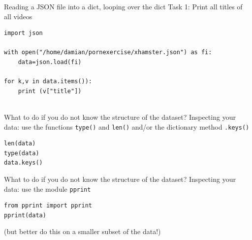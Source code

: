 \documentclass{beamer}
\begin{document}
\begin{frame}[fragile]{Reading a JSON file into a dict, looping over the dict}
Task 1: Print all titles of all videos
\begin{lstlisting}
import json

with open("/home/damian/pornexercise/xhamster.json") as fi:
    data=json.load(fi)

for k,v in data.items()):
    print (v["title"])
            
\end{lstlisting}
\end{frame}


\begin{frame}[fragile]{What to do if you do not know the structure of the dataset?}
	Inspecting your data: use the functions \texttt{type()} and \texttt{len()} and/or the dictionary method \texttt{.keys()}
\begin{lstlisting}
len(data)
type(data)
data.keys()
\end{lstlisting}
\end{frame}


\begin{frame}[fragile]{What to do if you do not know the structure of the dataset?}
Inspecting your data: use the module \texttt{pprint} 
\begin{lstlisting}
from pprint import pprint
pprint(data)
\end{lstlisting}

(but better do this on a smaller subset of the data!)
\end{frame}


\begin{frame}[plain]{}
\end{frame}
\end{document}
